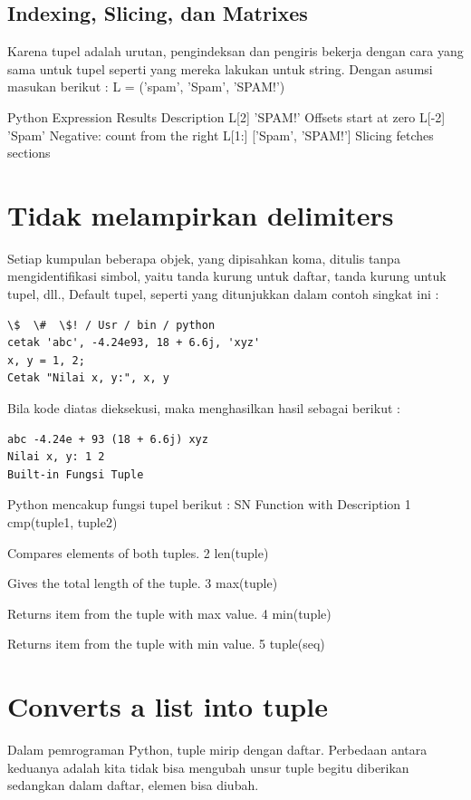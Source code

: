 \subsection{Indexing, Slicing, dan Matrixes}
Karena tupel adalah urutan, pengindeksan dan pengiris bekerja dengan cara yang sama untuk tupel seperti yang mereka lakukan untuk string. Dengan asumsi masukan berikut : 
L = ('spam', 'Spam', 'SPAM!')

Python Expression  Results   Description
L[2]  'SPAM!'  Offsets start at zero 
L[-2]  'Spam'  Negative: count from the right 
L[1:]  ['Spam', 'SPAM!'] Slicing fetches sections 

\section{Tidak melampirkan delimiters} 
Setiap kumpulan beberapa objek, yang dipisahkan koma, ditulis tanpa mengidentifikasi simbol, yaitu tanda kurung untuk daftar, tanda kurung untuk tupel, dll., Default tupel, seperti yang ditunjukkan dalam contoh singkat ini :
\begin{verbatim}
\$  \#  \$! / Usr / bin / python
cetak 'abc', -4.24e93, 18 + 6.6j, 'xyz'
x, y = 1, 2; 
Cetak "Nilai x, y:", x, y
\end{verbatim}
Bila kode diatas dieksekusi, maka menghasilkan hasil sebagai berikut :
\begin{verbatim}
abc -4.24e + 93 (18 + 6.6j) xyz
Nilai x, y: 1 2 
Built-in Fungsi Tuple 
\end{verbatim}
Python mencakup fungsi tupel berikut :
SN Function with Description 
1 cmp(tuple1, tuple2) 

Compares elements of both tuples. 
2  len(tuple) 

Gives the total length of the tuple. 
3  max(tuple) 

Returns item from the tuple with max value. 
4  min(tuple) 

Returns item from the tuple with min value. 
5  tuple(seq) 

\section{Converts a list into tuple} 
Dalam pemrograman Python, tuple mirip dengan daftar. Perbedaan antara keduanya adalah kita tidak bisa mengubah unsur tuple begitu diberikan sedangkan dalam daftar, elemen bisa diubah. 
